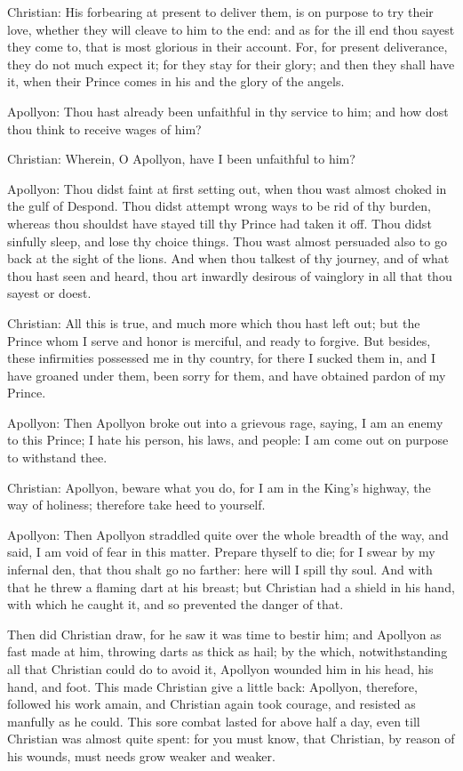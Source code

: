 Christian: His forbearing at present to deliver them, is on purpose to try their love, whether they will cleave to him to the end: and as for the ill end thou sayest they come to, that is most glorious in their account. For, for present deliverance, they do not much expect it; for they stay for their glory; and then they shall have it, when their Prince comes in his and the glory of the angels.

Apollyon: Thou hast already been unfaithful in thy service to him; and how dost thou think to receive wages of him?

Christian: Wherein, O Apollyon, have I been unfaithful to him?

Apollyon: Thou didst faint at first setting out, when thou wast almost choked in the gulf of Despond. Thou didst attempt wrong ways to be rid of thy burden, whereas thou shouldst have stayed till thy Prince had taken it off. Thou didst sinfully sleep, and lose thy choice things. Thou wast almost persuaded also to go back at the sight of the lions. And when thou talkest of thy journey, and of what thou hast seen and heard, thou art inwardly desirous of vainglory in all that thou sayest or doest.

Christian: All this is true, and much more which thou hast left out; but the Prince whom I serve and honor is merciful, and ready to forgive. But besides, these infirmities possessed me in thy country, for there I sucked them in, and I have groaned under them, been sorry for them, and have obtained pardon of my Prince.

Apollyon: Then Apollyon broke out into a grievous rage, saying, I am an enemy to this Prince; I hate his person, his laws, and people: I am come out on purpose to withstand thee.

Christian: Apollyon, beware what you do, for I am in the King's highway, the way of holiness; therefore take heed to yourself.

Apollyon: Then Apollyon straddled quite over the whole breadth of the way, and said, I am void of fear in this matter. Prepare thyself to die; for I swear by my infernal den, that thou shalt go no farther: here will I spill thy soul. And with that he threw a flaming dart at his breast; but Christian had a shield in his hand, with which he caught it, and so prevented the danger of that.

Then did Christian draw, for he saw it was time to bestir him; and Apollyon as fast made at him, throwing darts as thick as hail; by the which, notwithstanding all that Christian could do to avoid it, Apollyon wounded him in his head, his hand, and foot. This made Christian give a little back: Apollyon, therefore, followed his work amain, and Christian again took courage, and resisted as manfully as he could. This sore combat lasted for above half a day, even till Christian was almost quite spent: for you must know, that Christian, by reason of his wounds, must needs grow weaker and weaker.

